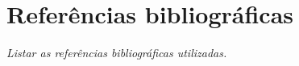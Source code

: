 \documentclass[14]{article}
\begin{document}
\section{Referências bibliográficas}
{\em Listar as referências bibliográficas utilizadas.
}

%
%

\end{document}

